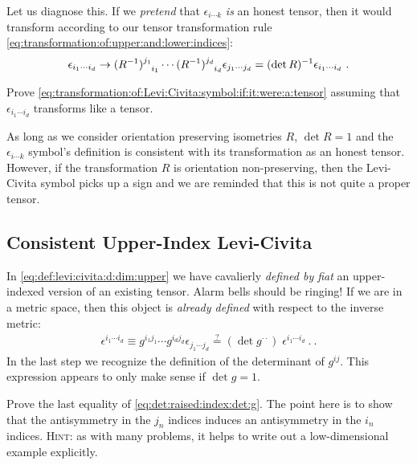 \documentclass[12pt, oneside]{report}    %
\begin{document}
\begin{subappendices}
Let us diagnose this. If we \emph{pretend} that $\epsilon_{i\cdots k}$ \emph{is} an honest tensor, then it would transform according to our tensor transformation rule \eqref{eq:transformation:of:upper:and:lower:indices}:
\begin{align}
    \epsilon_{i_1\cdots i_d} \to 
    (R\inv)\aij{j_1}{i_1}\cdots
    (R\inv)\aij{j_d}{i_d}
    \epsilon_{j_1 \cdots j_d} 
    =
    (\det R)\inv \epsilon_{i_1\cdots i_d}
    \label{eq:transformation:of:Levi:Civita:symbol:if:it:were:a:tensor}
    \ .
\end{align}
\begin{exercise}
Prove \eqref{eq:transformation:of:Levi:Civita:symbol:if:it:were:a:tensor} assuming that $\epsilon_{i_1\cdots i_d}$ transforms like a tensor.
\end{exercise}
As long as we consider orientation preserving isometries $R$, $\det R =1$ and the $\epsilon_{i \cdots k}$ symbol's definition is consistent with its transformation as an honest tensor. However, if the transformation $R$ is orientation non-preserving, then the Levi-Civita symbol picks up a sign and we are reminded that this is not quite a proper tensor. 

\subsection{Consistent Upper-Index Levi-Civita}
In \eqref{eq:def:levi:civita:d:dim:upper} we have cavalierly \emph{defined by fiat} an upper-indexed version of an existing tensor. Alarm bells should be ringing! If we are in a metric space, then this object is \emph{already defined} with respect to the inverse metric:
\begin{align}
    \epsilon^{i_1\cdots i_d}
    \equiv
    g^{i_1j_1}
    \cdots
    g^{i_dj_d}
    \epsilon_{j_1\cdots j_d}
    \stackrel{?}{=}
    (\det g^{\cdot\cdot}) \;
    \epsilon^{i_1\cdots i_d} \ .
    \label{eq:det:raised:index:det:g}
     \ .
\end{align}
In the last step we recognize the definition of the determinant of $g^{ij}$. This expression appears to only make sense if $\det g = 1$.
\begin{exercise}
Prove the last equality of \eqref{eq:det:raised:index:det:g}. The point here is to show that the antisymmetry in the $j_n$ indices induces an antisymmetry in the $i_n$ indices. \textsc{Hint}: as with many problems, it helps to write out a low-dimensional example explicitly.
\end{exercise}


\end{subappendices}
\end{document}
